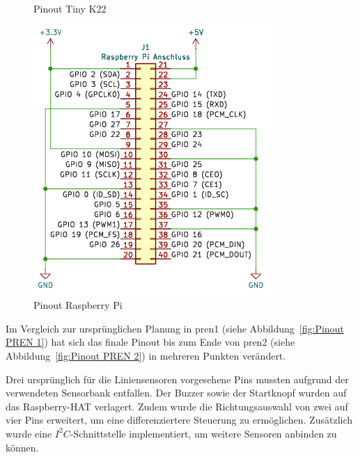 \begin{figure}[H]
\begin{minipage}[b]{0.45\textwidth}
  \caption{Pinout Tiny K22}
  \label{fig:Pinout TinyK22}
\end{minipage}
\hspace{0.05\textwidth} %
\begin{minipage}[b]{0.45\textwidth}
  \centering
  \includegraphics[width=\textwidth]{assets/ET/Software/RaspyHat_Pinout.png}
  \caption{Pinout Raspberry Pi}
  \label{fig:Pinout Raspy Hat}
\end{minipage}
\end{figure}

Im Vergleich zur ursprünglichen Planung in \gls{pren1} (siehe Abbildung~\ref{fig:Pinout PREN 1}) hat sich das finale Pinout bis zum Ende von \gls{pren2} (siehe Abbildung~\ref{fig:Pinout PREN 2}) in mehreren Punkten verändert.

Drei ursprünglich für die Liniensensoren vorgesehene Pins mussten aufgrund der verwendeten Sensorbank entfallen. Der Buzzer sowie der Startknopf wurden auf das Raspberry-HAT verlagert. Zudem wurde die Richtungsauswahl von zwei auf vier Pins erweitert, um eine differenziertere Steuerung zu ermöglichen. Zusätzlich wurde eine $I^2C$-Schnittstelle implementiert, um weitere Sensoren anbinden zu können. 


